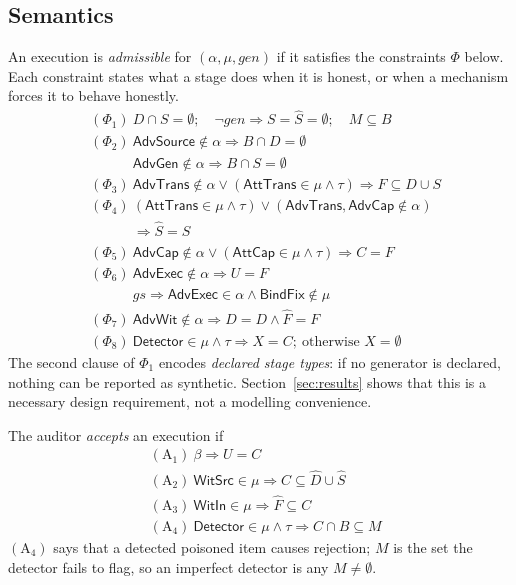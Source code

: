 \subsection{Semantics}

An execution is \emph{admissible} for $(\alpha,\mu,\mathit{gen})$ if it satisfies the
constraints $\Phi$ below. Each constraint states what a stage does when it is honest, or
when a mechanism forces it to behave honestly.
{\small
\begin{align*}
&(\Phi_1)\ D\cap S=\emptyset;\quad \neg\mathit{gen}\Rightarrow S=\hat S=\emptyset;\quad M\subseteq B\\
&(\Phi_2)\ \textsf{AdvSource}\notin\alpha\Rightarrow B\cap D=\emptyset\\
&\phantom{(\Phi_2)}\ \textsf{AdvGen}\notin\alpha\Rightarrow B\cap S=\emptyset\\
&(\Phi_3)\ \textsf{AdvTrans}\notin\alpha \vee (\textsf{AttTrans}\in\mu\wedge\tau)\Rightarrow F\subseteq D\cup S\\
&(\Phi_4)\ (\textsf{AttTrans}\in\mu\wedge\tau)\vee(\textsf{AdvTrans},\textsf{AdvCap}\notin\alpha)\\
&\phantom{(\Phi_4)}\ \Rightarrow \hat S=S\\
&(\Phi_5)\ \textsf{AdvCap}\notin\alpha\vee(\textsf{AttCap}\in\mu\wedge\tau)\Rightarrow C=F\\
&(\Phi_6)\ \textsf{AdvExec}\notin\alpha\Rightarrow U=F\\
&\phantom{(\Phi_6)}\ \mathit{gs}\Rightarrow\textsf{AdvExec}\in\alpha\wedge\textsf{BindFix}\notin\mu\\
&(\Phi_7)\ \textsf{AdvWit}\notin\alpha\Rightarrow\hat D=D\wedge \hat F=F\\
&(\Phi_8)\ \textsf{Detector}\in\mu\wedge\tau\Rightarrow X=C;\ \text{otherwise } X=\emptyset
\end{align*}}
The second clause of $\Phi_1$ encodes \emph{declared stage types}: if no generator is
declared, nothing can be reported as synthetic. Section~\ref{sec:results} shows that this is
a necessary design requirement, not a modelling convenience.

The auditor \emph{accepts} an execution if
{\small
\begin{align*}
&(\mathrm{A}_1)\ \beta\Rightarrow U=C\\
&(\mathrm{A}_2)\ \textsf{WitSrc}\in\mu\Rightarrow C\subseteq \hat D\cup\hat S\\
&(\mathrm{A}_3)\ \textsf{WitIn}\in\mu\Rightarrow \hat F\subseteq C\\
&(\mathrm{A}_4)\ \textsf{Detector}\in\mu\wedge\tau\Rightarrow C\cap B\subseteq M
\end{align*}}
$(\mathrm{A}_4)$ says that a detected poisoned item causes rejection; $M$ is the set the
detector fails to flag, so an imperfect detector is any $M\neq\emptyset$.

